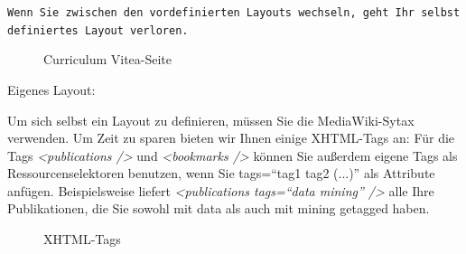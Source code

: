 \begin{mdframed}[style=mdfexample1,frametitle={\texttt{ACHTUNG}},backgroundcolor=gray!40]\texttt{Wenn Sie zwischen den vordefinierten Layouts wechseln, geht Ihr selbst definiertes Layout verloren.} 
\end{mdframed}
\begin{figure}[h!]
 \centering
 \caption{Curriculum Vitea-Seite}
 \label{figure006}
\end{figure}  
\hypertarget{Eigenes Layout}{Eigenes Layout:}
\newline
Um sich selbst ein Layout zu definieren, müssen Sie die MediaWiki-Sytax verwenden. Um Zeit zu sparen bieten wir Ihnen einige XHTML-Tags an: %
\newline
Für die Tags \textit{<publications />} und \textit{<bookmarks />} können Sie außerdem eigene Tags als Ressourcenselektoren benutzen, wenn Sie tags=\enquote{tag1 tag2 (...)} als Attribute anfügen. Beispielsweise liefert \textit{<publications tags=\enquote{data mining} />} alle Ihre Publikationen, die Sie sowohl mit data als auch mit mining getagged haben. 
\begin{figure}[h!]
 \centering
 \caption{XHTML-Tags}
 \label{figure007}
\end{figure}  
